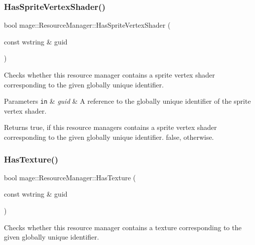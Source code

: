 \subsubsection{\texorpdfstring{Has\+Sprite\+Vertex\+Shader()}{HasSpriteVertexShader()}}
{\footnotesize\ttfamily bool mage\+::\+Resource\+Manager\+::\+Has\+Sprite\+Vertex\+Shader (\begin{DoxyParamCaption}\item[{const wstring \&}]{guid }\end{DoxyParamCaption})\hspace{0.3cm}{\ttfamily [noexcept]}}

Checks whether this resource manager contains a sprite vertex shader corresponding to the given globally unique identifier.


\begin{DoxyParams}[1]{Parameters}
\mbox{\tt in}  & {\em guid} & A reference to the globally unique identifier of the sprite vertex shader. \\
\hline
\end{DoxyParams}
\begin{DoxyReturn}{Returns}
{\ttfamily true}, if this resource managers contains a sprite vertex shader corresponding to the given globally unique identifier. {\ttfamily false}, otherwise. 
\end{DoxyReturn}
\hypertarget{classmage_1_1_resource_manager_a617768fb9ec0c7c8f00b3f34c6386dfa}{}\label{classmage_1_1_resource_manager_a617768fb9ec0c7c8f00b3f34c6386dfa} 
\subsubsection{\texorpdfstring{Has\+Texture()}{HasTexture()}}
{\footnotesize\ttfamily bool mage\+::\+Resource\+Manager\+::\+Has\+Texture (\begin{DoxyParamCaption}\item[{const wstring \&}]{guid }\end{DoxyParamCaption})\hspace{0.3cm}{\ttfamily [noexcept]}}

Checks whether this resource manager contains a texture corresponding to the given globally unique identifier.


